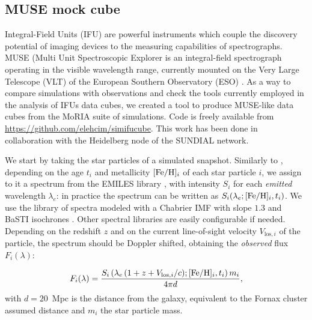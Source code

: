 \subsection{MUSE mock cube}
Integral-Field Units (IFU) are powerful instruments which couple the discovery potential of imaging devices to the measuring capabilities of spectrographs.
MUSE (Multi Unit Spectroscopic Explorer is an integral-field spectrograph operating in the visible wavelength range, currently mounted on the Very Large Telescope (VLT) of the European Southern Observatory (ESO) \citep{Bacon2010, MUSEWebpage}.
As a way to compare simulations with observations and check the tools currently employed in the analysis of IFUs data cubes, we created a tool to produce MUSE-like data cubes from the MoRIA suite of simulations.
Code is freely available from \url{https://github.com/elehcim/simifucube}.
This work has been done in collaboration with the Heidelberg node of the SUNDIAL network.

We start by taking the star particles of a simulated snapshot.
Similarly to \citet{Ibarra-Medel2019}, depending on the age $t_i$ and metallicity $[\text{Fe}/\text{H}]_i$ of each star particle $i$, we assign to it a spectrum from the EMILES library \citep{Vazdekis2010}, with intensity $S_i$ for each \emph{emitted} wavelength $\lambda_e$: in practice the spectrum can be written as $S_i(\lambda_e;[\text{Fe}/\text{H}]_i, t_i)$.
We use the library of spectra modeled with a Chabrier IMF with slope $1.3$ and BaSTI isochrones \citep[][Bag of Stellar Tracks and Isochrones]{Pietrinferni2013}.
Other spectral libraries are easily configurable if needed.
Depending on the redshift $z$ and on the current line-of-sight velocity $V_{\mathrm{los},i}$ of the particle, the spectrum should be Doppler shifted, obtaining the \emph{observed} flux $F_i(\lambda)$:

\begin{equation}
  F_i(\lambda) = \frac{S_i\left(\lambda_e\,(1 + z + V_{\mathrm{los},i}/c);[\text{Fe}/\text{H}]_i, t_i \right) m_i }{4\pi d},
  \label{eq:shifted_flux}
\end{equation}
with $d = 20$~Mpc is the distance from the galaxy, equivalent to the Fornax cluster assumed distance and $m_i$ the star particle mass.


